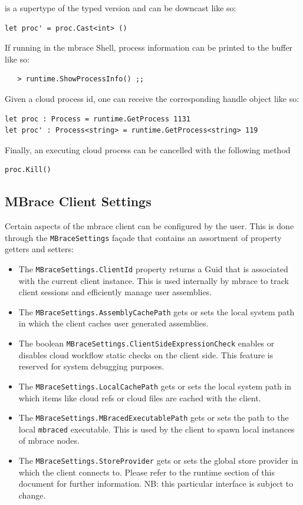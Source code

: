 \documentclass[9pt,a4paper]{article}
\newcommand{\mbrace}{mbrace}
\newcommand{\TitularMbrace}{MBrace}
\begin{document}
is a supertype of the typed version and can be downcast like so:
\begin{lstlisting}
let proc' = proc.Cast<int> ()
\end{lstlisting}
If running in the \mbrace{} Shell, process information can be printed to the buffer like so:
\begin{verbatim}
   > runtime.ShowProcessInfo() ;;
\end{verbatim}
Given a cloud process id, one can receive the corresponding handle object like so:
\begin{lstlisting}
let proc : Process = runtime.GetProcess 1131
let proc' : Process<string> = runtime.GetProcess<string> 119
\end{lstlisting}
Finally, an executing cloud process can be cancelled with the following method
\begin{lstlisting}
proc.Kill()
\end{lstlisting}

\subsection{\TitularMbrace{} Client Settings}

Certain aspects of the \mbrace{} client can be configured by the user.
This is done through the \texttt{MBraceSettings} fa\c{c}ade that contains an
assortment of property getters and setters:
\begin{itemize}
\item The \texttt{MBraceSettings.ClientId} property returns a Guid that is
associated with the current client instance. This is used internally by \mbrace{} to
track client sessions and efficiently manage user assemblies.
\item The \texttt{MBraceSettings.AssemblyCachePath} gets or sets the local system 
path in which the client caches user generated assemblies.
\item The boolean \texttt{MBraceSettings.ClientSideExpressionCheck} enables or 
disables cloud workflow static checks on the client side. This feature is reserved
for system debugging purposes.
\item The \texttt{MBraceSettings.LocalCachePath} gets or sets the local system path
in which items like cloud refs or cloud files are cached with the client.
\item The \texttt{MBraceSettings.MBracedExecutablePath} gets or sets the path to the
local \texttt{mbraced} executable. This is used by the client to spawn local instances
of \mbrace{} nodes.
\item The \texttt{MBraceSettings.StoreProvider} gets or sets the global store provider
in which the client connects to. Please refer to the runtime section of this document
for further information. NB: this particular interface is subject to change.
\end{itemize}
%
%
%
\end{document}
